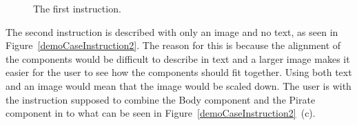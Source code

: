 	\begin{figure}[ht!]
		\centering
		\qquad
		\qquad
		\caption{The first instruction.}
		\label{demoCaseInstruction1}
	\end{figure}

The second instruction is described with only an image and no text, as seen in Figure~\ref{demoCaseInstruction2}. The reason for this is because the alignment of the components would be difficult to describe in text and a larger image makes it easier for the user to see how the components should fit together. Using both text and an image would mean that the image would be scaled down. The user is with the instruction supposed to combine the Body component and the Pirate component in to what can be seen in Figure~\ref{demoCaseInstruction2}~(c).

